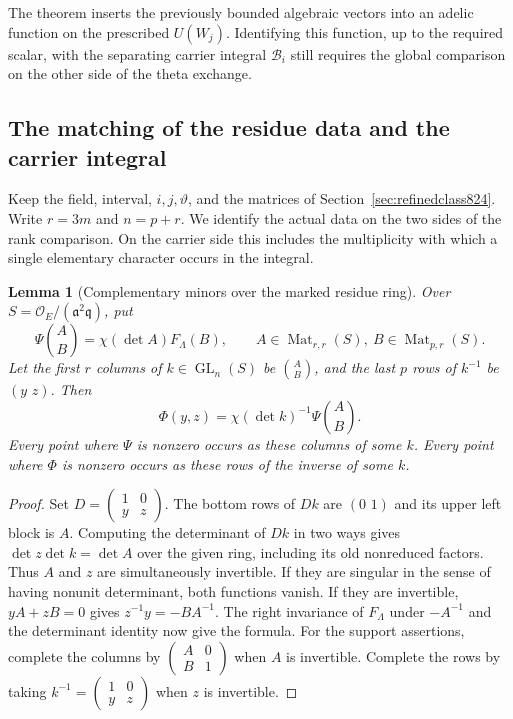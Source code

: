 \documentclass[a4paper,11pt]{article}
\newtheorem{lemma}[proposition]{Lemma}
\theoremstyle{definition}
\theoremstyle{remark}
\numberwithin{equation}{section}
\newcommand{\OO}{\mathcal O}
\begin{document}
The theorem inserts the previously bounded algebraic vectors
into an adelic function on the prescribed \(U(W_j)\). Identifying
this function, up to the required scalar, with the separating
carrier integral \(\mathcal B_i\) still requires the global
comparison on the other side of the theta exchange.
\clearpage

\subsection{The matching of the residue data and the carrier integral}
\label{sec:carrierdata825}
Keep the field, interval, \(i,j,\vartheta\), and the matrices
of Section~\ref{sec:refinedclass824}. Write \(r=3m\) and
\(n=p+r\). We identify the actual data on the two sides of the
rank comparison. On the carrier side this includes the
multiplicity with which a single elementary character occurs
in the integral.

\begin{lemma}[Complementary minors over the marked residue ring]
\leavevmode\label{lem:residuepartners825}
Over \(S=\OO_E/(\mathfrak a^2\mathfrak q)\), put
\[
 \Psi\binom{A}{B}=\chi(\det A)F_\Lambda(B),
 \qquad A\in\operatorname{Mat}_{r,r}(S),\
        B\in\operatorname{Mat}_{p,r}(S).
\]
Let the first \(r\) columns of \(k\in\operatorname{GL}_n(S)\)
be \(\binom{A}{B}\), and the last \(p\) rows of \(k^{-1}\)
be \((y\,\,z)\). Then
\[
       \Phi(y,z)=\chi(\det k)^{-1}\Psi\binom{A}{B}.
\]
Every point where \(\Psi\) is nonzero occurs as these columns
of some \(k\). Every point where \(\Phi\) is nonzero occurs
as these rows of the inverse of some \(k\).
\end{lemma}
\begin{proof}
Set \(D=\left(\begin{smallmatrix}1&0\\y&z\end{smallmatrix}\right)\).
The bottom rows of \(Dk\) are \((0\,\,1)\) and its upper
left block is \(A\). Computing the determinant of \(Dk\) in
two ways gives \(\det z\det k=\det A\) over the given ring,
including its old nonreduced factors. Thus \(A\) and \(z\) are
simultaneously invertible. If they are singular in the sense
of having nonunit determinant, both functions vanish. If they
are invertible, \(yA+zB=0\) gives \(z^{-1}y=-BA^{-1}\).
The right invariance of \(F_\Lambda\) under \(-A^{-1}\)
and the determinant identity now give the formula.
For the support assertions, complete the columns by
\(\left(\begin{smallmatrix}A&0\\B&1\end{smallmatrix}\right)\)
when \(A\) is invertible. Complete the rows by taking
\(k^{-1}=\left(\begin{smallmatrix}1&0\\y&z\end{smallmatrix}\right)\)
when \(z\) is invertible.
\end{proof}
\end{document}
